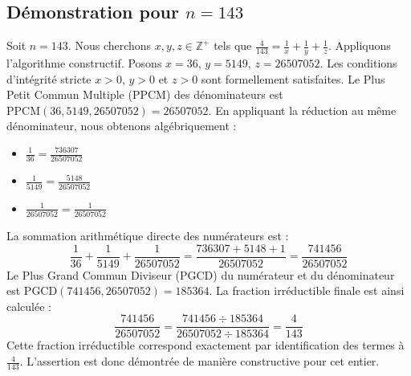 \documentclass[11pt,a4paper]{article}
\begin{document}
\subsection{Démonstration pour $n = 143$}
Soit $n = 143$. Nous cherchons $x, y, z \in \mathbb{Z}^{+}$ tels que $\frac{4}{143} = \frac{1}{x} + \frac{1}{y} + \frac{1}{z}$.
Appliquons l'algorithme constructif. Posons $x = 36$, $y = 5149$, $z = 26507052$.
Les conditions d'intégrité stricte $x > 0$, $y > 0$ et $z > 0$ sont formellement satisfaites.
Le Plus Petit Commun Multiple (PPCM) des dénominateurs est $\text{PPCM}(36, 5149, 26507052) = 26507052$.
En appliquant la réduction au même dénominateur, nous obtenons algébriquement :
\begin{itemize}
    \item $\frac{1}{36} = \frac{736307}{26507052}$
    \item $\frac{1}{5149} = \frac{5148}{26507052}$
    \item $\frac{1}{26507052} = \frac{1}{26507052}$
\end{itemize}
La sommation arithmétique directe des numérateurs est :
$$ \frac{1}{36} + \frac{1}{5149} + \frac{1}{26507052} = \frac{736307 + 5148 + 1}{26507052} = \frac{741456}{26507052} $$
Le Plus Grand Commun Diviseur (PGCD) du numérateur et du dénominateur est $\text{PGCD}(741456, 26507052) = 185364$.
La fraction irréductible finale est ainsi calculée :
$$ \frac{741456}{26507052} = \frac{741456 \div 185364}{26507052 \div 185364} = \frac{4}{143} $$
Cette fraction irréductible correspond exactement par identification des termes à $\frac{4}{143}$. L'assertion est donc démontrée de manière constructive pour cet entier.
\end{document}

